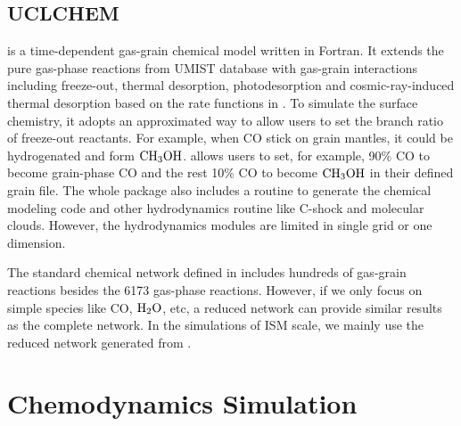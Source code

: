 \section{UCLCHEM}
{\UCLCHEM} \cite{Holdship2017a} is a time-dependent gas-grain chemical model written in Fortran. It extends the pure gas-phase reactions from UMIST database with gas-grain interactions including freeze-out, thermal desorption, photodesorption and cosmic-ray-induced thermal desorption based on the rate functions in \cite{Roberts2007}. To simulate the surface chemistry, it adopts an approximated way to allow users to set the branch ratio of freeze-out reactants. For example, when CO stick on grain mantles, it could be hydrogenated and form $\rm CH_3OH$. {\UCLCHEM} allows users to set, for example, 90\% CO to become grain-phase CO and the rest 10\% CO to become $\rm CH_3OH$ in their defined grain file. The whole package also includes a routine to generate the chemical modeling code and other hydrodynamics routine like C-shock and molecular clouds. However, the hydrodynamics modules are limited in single grid or one dimension.

The standard chemical network defined in {\UCLCHEM} includes hundreds of gas-grain reactions besides the 6173 gas-phase reactions. However, if we only focus on simple species like CO, $\rm H_2O$, etc, a reduced network can provide similar results as the complete network. In the simulations of ISM scale, we mainly use the reduced network generated from {\UCLCHEM}.









%
\chapter{Chemodynamics Simulation\label{ch:chemo}}

